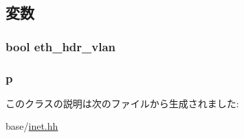 \subsection{変数}
\hypertarget{classNet_1_1IpPtr_a0d4c03dd0e48319a9a4c5f4148c8a496}{
\subsubsection[{eth\_\-hdr\_\-vlan}]{\setlength{\rightskip}{0pt plus 5cm}bool {\bf eth\_\-hdr\_\-vlan}}}
\label{classNet_1_1IpPtr_a0d4c03dd0e48319a9a4c5f4148c8a496}
\hypertarget{classNet_1_1IpPtr_a764b18a7236ca83fd4bd750516da7d09}{
\subsubsection[{p}]{ {\bf p}}}
\label{classNet_1_1IpPtr_a764b18a7236ca83fd4bd750516da7d09}


このクラスの説明は次のファイルから生成されました:\begin{DoxyCompactItemize}
\item 
base/\hyperlink{inet_8hh}{inet.hh}\end{DoxyCompactItemize}

